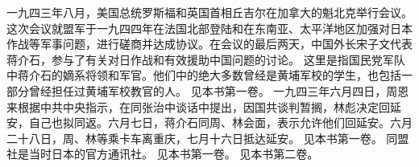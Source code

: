 \begin{maonote}
一九四三年八月，美国总统罗斯福和英国首相丘吉尔在加拿大的魁北克举行会议。这次会议就盟军于一九四四年在法国北部登陆和在东南亚、太平洋地区加强对日本作战等军事问题，进行磋商并达成协议。在会议的最后两天，中国外长宋子文代表蒋介石，参与了有关对日作战和有效援助中国问题的讨论。
这里是指国民党军队中蒋介石的嫡系将领和军官。他们中的绝大多数曾经是黄埔军校的学生，也包括一部分曾经担任过黄埔军校教官的人。
见本书第一卷。
一九四三年六月四日，周恩来根据中共中央指示，在同张治中谈话中提出，因国共谈判暂搁，林彪决定回延安，自己也拟同返。六月七日，蒋介石同周、林会面，表示允许他们回延安。六月二十八日，周、林等乘卡车离重庆，七月十六日抵达延安。
见本书第一卷。
同盟社是当时日本的官方通讯社。
见本书第一卷。
见本书第二卷。
\end{maonote}
